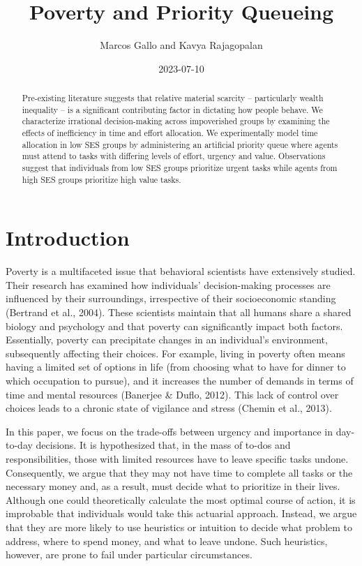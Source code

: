 \documentclass[
]{report}
\title{Poverty and Priority Queueing}
\author{Marcos Gallo and Kavya Rajagopalan}
\date{2023-07-10}
\renewcommand*\contentsname{Table of contents}
\newcommand\contentsname{Table of contents}
\begin{document}
\maketitle
\begin{abstract}
Pre-existing literature suggests that relative material scarcity --
particularly wealth inequality -- is a significant contributing factor
in dictating how people behave. We characterize irrational
decision-making across impoverished groups by examining the effects of
inefficiency in time and effort allocation. We experimentally model time
allocation in low SES groups by administering an artificial priority
queue where agents must attend to tasks with differing levels of effort,
urgency and value. Observations suggest that individuals from low SES
groups prioritize urgent tasks while agents from high SES groups
prioritize high value tasks.
\end{abstract}
\ifdefined\Shaded\renewenvironment{Shaded}{\begin{tcolorbox}[sharp corners, interior hidden, breakable, enhanced, boxrule=0pt, borderline west={3pt}{0pt}{shadecolor}, frame hidden]}{\end{tcolorbox}}\fi

\renewcommand*\contentsname{Table of contents}
{
\hypersetup{linkcolor=}
\setcounter{tocdepth}{2}
\tableofcontents
}
\hypertarget{introduction}{%
\chapter{Introduction}\label{introduction}}

Poverty is a multifaceted issue that behavioral scientists have
extensively studied. Their research has examined how individuals'
decision-making processes are influenced by their surroundings,
irrespective of their socioeconomic standing (Bertrand et al., 2004).
These scientists maintain that all humans share a shared biology and
psychology and that poverty can significantly impact both factors.
Essentially, poverty can precipitate changes in an individual's
environment, subsequently affecting their choices. For example, living
in poverty often means having a limited set of options in life (from
choosing what to have for dinner to which occupation to pursue), and it
increases the number of demands in terms of time and mental resources
(Banerjee \& Duflo, 2012). This lack of control over choices leads to a
chronic state of vigilance and stress (Chemin et al., 2013).

In this paper, we focus on the trade-offs between urgency and importance
in day-to-day decisions. It is hypothesized that, in the mass of to-dos
and responsibilities, those with limited resources have to leave
specific tasks undone. Consequently, we argue that they may not have
time to complete all tasks or the necessary money and, as a result, must
decide what to prioritize in their lives. Although one could
theoretically calculate the most optimal course of action, it is
improbable that individuals would take this actuarial approach. Instead,
we argue that they are more likely to use heuristics or intuition to
decide what problem to address, where to spend money, and what to leave
undone. Such heuristics, however, are prone to fail under particular
circumstances.
\end{document}
